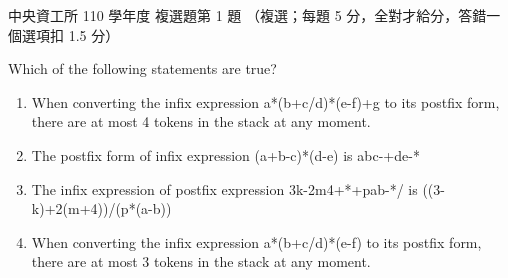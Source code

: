 \begin{pastexam}[label={px:ncu-110-dsa-01}]{中央資工所 110 學年度 複選題第 1 題}
（複選；每題 5 分，全對才給分，答錯一個選項扣 1.5 分）

Which of the following statements are true?
\begin{enumerate}[label=(\Alph*)]
\item When converting the infix expression a*(b+c/d)*(e-f)+g to its postfix form, there are at
most 4 tokens in the stack at any moment.
\item The postfix form of infix expression (a+b-c)*(d-e) is abc-+de-*
\item The infix expression of postfix expression 3k-2m4+*+pab-*/ is ((3-k)+2(m+4))/(p*(a-b))
\item When converting the infix expression a*(b+c/d)*(e-f) to its postfix form, there are at most
3 tokens in the stack at any moment.
\end{enumerate}
\end{pastexam}

